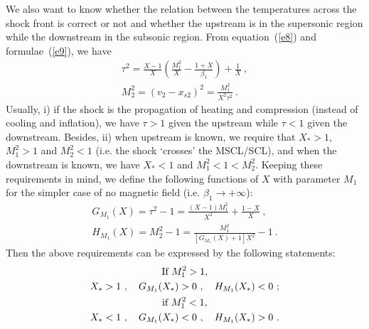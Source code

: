 \documentclass[fleqn,usenatbib]{mnras}
\begin{document}
We also want to know whether the relation between the temperatures across the shock front is correct or not and whether the upstream is in the supersonic region while the downstream in the subsonic region. From equation~(\ref{e8}) and formulae~(\ref{e9}), we have
\begin{gather}
\tau^{2}=\frac{X-1}{X}\left(\frac{M_{1}^{2}}{X}-\frac{1+X}{\beta_{1}}\right)+\frac{1}{X}\ ,\label{e13}\\
M_{2}^{2}=\left(v_{2}-x_{s2}\right)^{2}=\frac{M_{1}^{2}}{X^{2}\tau^{2}} \label{e14}\ .
\end{gather}
Usually, i) if the shock is the propagation of heating and compression (instead of cooling and inflation), we have $\tau>1$ given the upstream while $\tau<1$ given the downstream. Besides, ii) when upstream is known, we require that $X_{*}>1$, $M_{1}^{2}>1$ and $M_{2}^{2}<1$ (i.e. the shock `crosses' the MSCL/SCL), and when the downstream is known, we have $X_{*}<1$ and $M_{1}^{2}<1<M_{2}^{2}$. Keeping these requirements in mind, we define the following functions of $X$ with parameter $M_{1}$ for the simpler case of no magnetic field (i.e. $\beta_{1}\rightarrow+\infty$):
\begin{gather}
G_{M_{1}}(X)=\tau^{2}-1=\frac{(X-1)M_{1}^{2}}{X^{2}}+\frac{1-X}{X}\label{e15}\ ,\\
H_{M_{1}}(X)=M_{2}^{2}-1=\frac{M_{1}^{2}}{\left[G_{M_{1}}(X)+1\right]X^{2}}-1\label{e16}\ .
\end{gather}
Then the above requirements can be expressed by the following statements:
\begin{gather}
\text{If }M_{1}^{2}>1,\notag\\
X_{*}>1\ ,\quad G_{M_{1}}(X_{*})>0\ ,\quad H_{M_{1}}(X_{*})<0\ ;\label{e17}\\
\text{if }M_{1}^{2}<1,\notag\\
X_{*}<1\ ,\quad G_{M_{1}}(X_{*})<0\ ,\quad H_{M_{1}}(X_{*})>0\ .\label{e18}
\end{gather}
\end{document}
